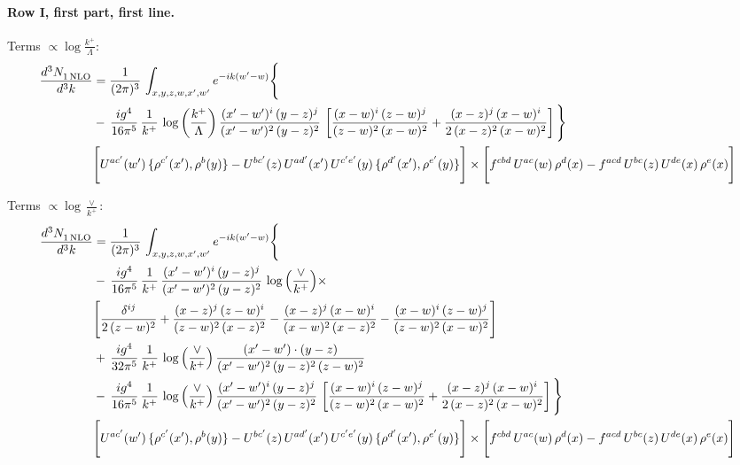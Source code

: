 \documentclass[10pt]{article}
\numberwithin{equation}{section}
\begin{document}
\paragraph{Row I, first part, first line.}
\noindent Terms $\propto\log\frac{k^+}{\Lambda}$:
\begin{align}
 \frac{d^{3}N_{1\,\rm NLO}^{\rm}}{d^{3}k}  & =     \frac{1}{(2\pi)^{3}}\,\int_{x,y,z,w,x',w^{\prime}} e^{-ik(w^{\prime}-w)}\Bigg\{\notag \\
& -\, \frac{ig^{4}}{16\pi^{5}}\,\frac{1}{k^{+}}\,\log{\left(\frac{k^{+}}{\Lambda}\right)}\,\frac{(x'-w')^{i}\,(y-z)^{j}}{(x'-w')^{2}\,(y-z)^{2}}\,\left[\frac{(x-w)^{i}\,(z-w)^{j}}{(z-w)^{2}\,(x-w)^{2}}+\frac{(x-z)^{j}\,(x-w)^{i}}{2\,(x-z)^{2}\, (x-w)^{2}}\right]\Bigg\} \notag \\ & \Bigg[U^{ac'}(w')\,\{\rho^{c'}(x'),\rho^{b}(y)\}-U^{bc'}(z)\,U^{ad'}(x')\,U^{c'e'}(y)\, \{\rho^{d'}(x'),\rho^{e'}(y)\}\Bigg]\times \Bigg[f^{cbd}\,U^{ac}(w)\,\rho^{d}(x)-f^{acd}\, U^{bc}(z)\,U^{de}(x)\,\rho^{e}(x)\Bigg]\notag \\ \label{eq:J:G2I1A}
\end{align}

\noindent Terms $\propto\log\frac{\vee}{k^+}$:
\begin{align}
 \frac{d^{3}N_{1\,\rm NLO}^{\rm}}{d^{3}k}  & =     \frac{1}{(2\pi)^{3}}\,\int_{x,y,z,w,x',w^{\prime}} e^{-ik(w^{\prime}-w)}\Bigg\{\notag \\
& -\, \frac{ig^{4}}{16\pi^{5}}\,\frac{1}{k^{+}}\, \frac{(x'-w')^{i}\,(y-z)^{j}}{(x'-w')^{2}\,(y-z)^{2}}\,\log{\left(\frac{\vee}{k^{+}}\right)}\times\notag \\ &  \Bigg[\frac{\delta^{ij}}{2\,(z-w)^{2}}+\frac{(x-z)^{j}\,(z-w)^{i}}{(z-w)^{2}\,(x-z)^{2}}-\frac{(x-z)^{j}\,(x-w)^{i}}{(x-w)^{2}\,(x-z)^{2}}-\frac{(x-w)^{i}\,(z-w)^{j}}{(z-w)^{2}\,(x-w)^{2}}\Bigg] \notag \\
& +\,\frac{ig^{4}}{32\pi^{5}}\,\frac{1}{k^{+}}\,\log{\left(\frac{\vee}{k^{+}}\right)}\, \frac{(x'-w')\cdot (y-z)}{(x'-w')^{2}\,(y-z)^{2}\,(z-w)^{2}} \notag \\
& -\, \frac{ig^{4}}{16\pi^{5}}\,\frac{1}{k^{+}}\,\log{\left(\frac{\vee}{k^{+}}\right)}\,\frac{(x'-w')^{i}\,(y-z)^{j}}{(x'-w')^{2}\,(y-z)^{2}}\,\left[\frac{(x-w)^{i}\,(z-w)^{j}}{(z-w)^{2}\,(x-w)^{2}}+\frac{(x-z)^{j}\,(x-w)^{i}}{2\,(x-z)^{2}\, (x-w)^{2}}\right]\Bigg\} \notag \\ & \Bigg[U^{ac'}(w')\,\{\rho^{c'}(x'),\rho^{b}(y)\}-U^{bc'}(z)\,U^{ad'}(x')\,U^{c'e'}(y)\, \{\rho^{d'}(x'),\rho^{e'}(y)\}\Bigg]\times \Bigg[f^{cbd}\,U^{ac}(w)\,\rho^{d}(x)-f^{acd}\, U^{bc}(z)\,U^{de}(x)\,\rho^{e}(x)\Bigg]\notag \\ \label{eq:B:G2I1A}
\end{align}
\end{document}

